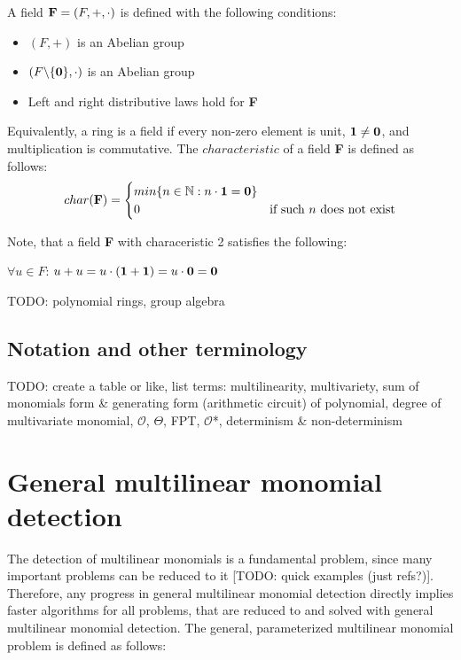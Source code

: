 A field $\textbf F = (F, +, \cdot)$ is defined with the following conditions:
\begin{itemize}
  \item $(F, +)$ is an Abelian group
  \item $(F\backslash \{\textbf 0\}, \cdot )$ is an Abelian group
  \item Left and right distributive laws hold for \textbf F
\end{itemize}

Equivalently, a ring is a field if every non-zero element is unit, $\textbf 1 \neq \textbf 0$, and multiplication is commutative. 
The $characteristic$ of a field \textbf F is defined as follows:
  \begin{equation}
    char(\textbf F) =
      \begin{cases}
        min\{n \in \mathbb N : n \cdot \textbf 1 = \textbf 0 \}\\
        0 & \text{if such $n$ does not exist}\\
      \end{cases}       
  \end{equation}

Note, that a field \textbf F with characeristic 2 satisfies the following:
\begin{center}
  $\forall u \in F$: $u + u = u \cdot (\textbf 1 + \textbf 1) = u \cdot \textbf 0 = \textbf 0$
\end{center}

TODO: polynomial rings, group algebra

\subsection{Notation and other terminology} %

TODO: create a table or like, list terms: 
multilinearity, multivariety, sum of monomials form \& generating form (arithmetic circuit) of polynomial, 
degree of multivariate monomial, $\mathcal{O}$, $\Theta$, FPT, $\mathcal{O}$*, determinism \& non-determinism

\section{General multilinear monomial detection}

The detection of multilinear monomials is a fundamental problem, 
since many important problems can be reduced to it [TODO: quick examples (just refs?)]. 
Therefore, any progress in general multilinear monomial detection directly implies 
faster algorithms for all problems, that are reduced to and solved with general multilinear monomial detection. 
The general, parameterized multilinear monomial problem is defined as follows: 

